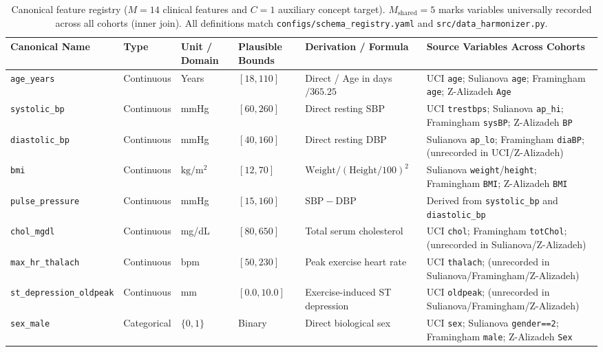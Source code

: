 \documentclass[journal]{IEEEtran}
\begin{document}
\begin{table}[t]
\caption{Canonical feature registry ($M=14$ clinical features and $C=1$ auxiliary concept target). $M_{\mathrm{shared}}=5$ marks variables universally recorded across all cohorts (inner join). All definitions match \texttt{configs/schema\_registry.yaml} and \texttt{src/data\_harmonizer.py}.}
\label{tab:schema}
\centering\footnotesize
\setlength{\tabcolsep}{3.5pt}
\begin{tabular}{lllllp{4.6cm}}
\toprule
Canonical Name & Type & Unit / Domain & Plausible Bounds & Derivation / Formula & Source Variables Across Cohorts\\
\midrule
\texttt{age\_years} & Continuous & Years & $[18, 110]$ & Direct / Age in days $/ 365.25$ & UCI \texttt{age}; Sulianova \texttt{age}; Framingham \texttt{age}; Z-Alizadeh \texttt{Age}\\
\texttt{systolic\_bp} & Continuous & mmHg & $[60, 260]$ & Direct resting SBP & UCI \texttt{trestbps}; Sulianova \texttt{ap\_hi}; Framingham \texttt{sysBP}; Z-Alizadeh \texttt{BP}\\
\texttt{diastolic\_bp} & Continuous & mmHg & $[40, 160]$ & Direct resting DBP & Sulianova \texttt{ap\_lo}; Framingham \texttt{diaBP}; (unrecorded in UCI/Z-Alizadeh)\\
\texttt{bmi} & Continuous & $\mathrm{kg/m^2}$ & $[12, 70]$ & $\mathrm{Weight} / (\mathrm{Height}/100)^2$ & Sulianova \texttt{weight}/\texttt{height}; Framingham \texttt{BMI}; Z-Alizadeh \texttt{BMI}\\
\texttt{pulse\_pressure} & Continuous & mmHg & $[15, 160]$ & $\mathrm{SBP} - \mathrm{DBP}$ & Derived from \texttt{systolic\_bp} and \texttt{diastolic\_bp}\\
\texttt{chol\_mgdl} & Continuous & mg/dL & $[80, 650]$ & Total serum cholesterol & UCI \texttt{chol}; Framingham \texttt{totChol}; (unrecorded in Sulianova/Z-Alizadeh)\\
\texttt{max\_hr\_thalach} & Continuous & bpm & $[50, 230]$ & Peak exercise heart rate & UCI \texttt{thalach}; (unrecorded in Sulianova/Framingham/Z-Alizadeh)\\
\texttt{st\_depression\_oldpeak} & Continuous & mm & $[0.0, 10.0]$ & Exercise-induced ST depression & UCI \texttt{oldpeak}; (unrecorded in Sulianova/Framingham/Z-Alizadeh)\\
\midrule
\texttt{sex\_male} & Categorical & $\{0, 1\}$ & Binary & Direct biological sex & UCI \texttt{sex}; Sulianova \texttt{gender==2}; Framingham \texttt{male}; Z-Alizadeh \texttt{Sex}\\

\end{tabular}
\end{table}
\end{document}
